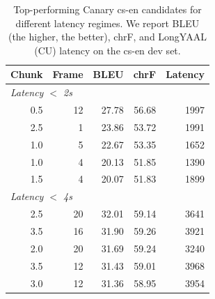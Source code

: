 \documentclass[11pt]{article}
\begin{document}
\begin{table}[]
    \centering
    \begin{tabular}{r@{~}r|r@{~}r@{~}r}
Chunk & Frame & BLEU & chrF & Latency \\
\hline
\multicolumn{5}{l}{\textit{Latency $<$ 2s}} \\
\hline
0.5 & 12 & 27.78 & 56.68 & 1997 \\
2.5 &  1 & 23.86 & 53.72 & 1991 \\
1.0 &  5 & 22.67 & 53.35 & 1652 \\
1.0 &  4 & 20.13 & 51.85 & 1390 \\
1.5 &  4 & 20.07 & 51.83 & 1899 \\
\hline
\multicolumn{5}{l}{\textit{Latency $<$ 4s}} \\
\hline
2.5 & 20 & 32.01 & 59.14 & 3641 \\
3.5 & 16 & 31.90 & 59.26 & 3921 \\
2.0 & 20 & 31.69 & 59.24 & 3240 \\
3.5 & 12 & 31.43 & 59.01 & 3968 \\
3.0 & 12 & 31.36 & 58.95 & 3954 \\
    \end{tabular}
    \caption{Top-performing Canary cs-en candidates for different latency regimes. We report BLEU (the higher, the better), chrF, and LongYAAL (CU) latency on the cs-en dev set.}
    \label{tab:canary-csen}
\end{table}

\def\sswhisper{SimulStreaming~Whisper}
\end{document}
